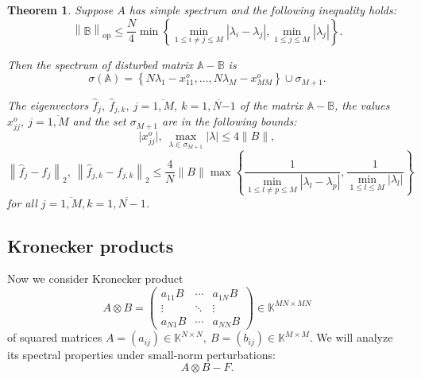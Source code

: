 \documentclass[a4paper]{jpconf}
\newtheorem{nkjpcsthm}{Theorem}
\begin{document}
\begin{nkjpcsthm}
Suppose \( A \) has simple spectrum and the following inequality holds:
\[
    \left\| \mathbb{B} \right\|_{\mathrm{op}}
        \leq 
        \frac{N}{4}
         \min\left\{
             \min\limits_{1\leq i{\neq}j \leq M }{|\lambda_i - \lambda_j|},
             \min\limits_{1\leq j \leq M}{|\lambda_j|}
         \right\}.
 \]

Then the spectrum of disturbed matrix \( \mathbb{A} - \mathbb{B} \) is
\[
    \sigma\left(\mathbb{A}\right) =
        \left\{
            N\lambda_1 - x_{11}^o, \ldots, N\lambda_M - x_{MM}^o
        \right\}
    \cup \sigma_{M{+}1}.
\]

The eigenvectors
    \( \hat{f}_j,\ \hat{f}_{j,k},\ j{=}\overline{1,M},\ k{=}\overline{1,N{-1}} \)
    of the matrix \( \mathbb{A}{-}\mathbb{B} \),
    the values \( x_{jj}^o,\ j{=}\overline{1,M} \)
    and the set \( \sigma_{M{+}1} \) are in the following bounds:
\[
    \lvert x_{jj}^o\rvert,
    \ \max_{\lambda\in\sigma_{M{+}1}} \lvert\lambda\rvert
    \leq 4\|B\|,
\]
\[
    \left\| \hat{f}_j - f_j \right\|_2,
    \ \left\| \hat{f}_{j,k} - f_{j,k}\right\|_2
    \leq
    \frac4N \|B\|
         \max\left\{
         \frac{1}{
             \min\limits_{1\leq l{\neq}p \leq M }{|\lambda_l - \lambda_p|}},
         \frac{1}{
             \min\limits_{1\leq l \leq M}{|\lambda_l|}}
         \right\}
\]
for all \( j{=}\overline{1,M}, k{=}\overline{1,N-1} \).
\end{nkjpcsthm}

\subsection*{Kronecker products}

Now we consider Kronecker product
\[
    A\otimes B =
    \begin{pmatrix}
        a_{11} B & \cdots & a_{1N} B \\
        \vdots   & \ddots & \vdots \\
        a_{N1} B & \cdots & a_{NN} B
    \end{pmatrix}
    \in \mathbb{K}^{{MN}{\times}{MN}}
\]
of squared matrices
\( A={(a_{ij})}\in\mathbb{K}^{N{\times}N},
 \ B={(b_{ij})}\in\mathbb{K}^{M{\times}M}. \)
We will analyze its spectral properties
    under small-norm perturbations:
\begin{equation}\label{nkjpcs-kronperturb}
    A\otimes B - F.
\end{equation}

\end{document}
